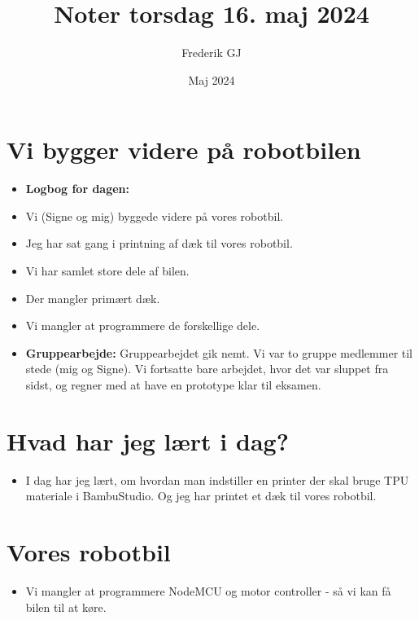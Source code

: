 \documentclass{article}
\title{Noter torsdag 16. maj 2024}
\author{Frederik GJ}
\date{Maj 2024}
\begin{document}
\maketitle

\section{Vi bygger videre på robotbilen}

\begin{itemize}
    \item \textbf{Logbog for dagen:}
    \item Vi (Signe og mig) byggede videre på vores robotbil. 
    \item Jeg har sat gang i printning af dæk til vores robotbil. 
    \item Vi har samlet store dele af bilen. 
    \item Der mangler primært dæk.
    \item Vi mangler at programmere de forskellige dele. 
    \item \textbf{Gruppearbejde:} Gruppearbejdet gik nemt. Vi var to gruppe medlemmer til stede (mig og Signe). Vi fortsatte bare arbejdet, hvor det var sluppet fra sidst, og regner med at have en prototype klar til eksamen.
\end{itemize}

\section{Hvad har jeg lært i dag?}
\begin{itemize}
    \item I dag har jeg lært, om hvordan man indstiller en printer der skal bruge TPU materiale i BambuStudio. Og jeg har printet et dæk til vores robotbil.   
\end{itemize}

\section{Vores robotbil}
\begin{itemize}
    \item Vi mangler at programmere NodeMCU og motor controller - så vi kan få bilen til at køre. 
\end{itemize}
\end{document}
